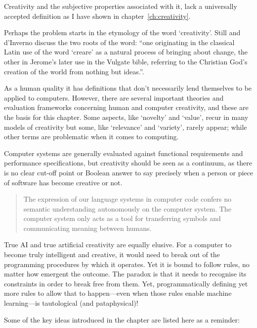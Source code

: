 Creativity and the subjective properties associated with it, lack a universally accepted definition as I have shown in chapter~\ref{ch:creativity}. 

Perhaps the problem starts in the etymology of the word `creativity'. Still and d'Inverno discuss the two roots of the word: ``one originating in the classical Latin use of the word `creare' as a natural process of bringing about change, the other in Jerome's later use in the Vulgate bible, referring to the Christian God's creation of the world from nothing but ideas.''\autocite*{Still2016}.

As a human quality it has definitions that don't necessarily lend themselves to be applied to computers. However, there are several important theories and evaluation frameworks concerning human and computer creativity, and these are the basis for this chapter. Some aspects, like `novelty' and `value', recur in many models of creativity but some, like `relevance' and `variety', rarely appear; while other terms are problematic when it comes to computing. 

Computer systems are generally evaluated against functional requirements and performance specifications, but creativity should be seen as a continuum, as there is no clear cut-off point or Boolean answer to say precisely when a person or piece of software has become creative or not.

\begin{quotation}
  The expression of our language systems in computer code confers no semantic understanding autonomously on the computer system. The computer system only acts as a tool for transferring symbols and communicating meaning between humans. 
\end{quotation}

True \ac{AI} and true artificial creativity are equally elusive. For a computer to become truly intelligent and creative, it would need to break out of the programming procedures by which it operates. Yet it is bound to follow rules, no matter how emergent the outcome. The paradox is that it needs to recognise its constraints in order to break free from them. Yet, programmatically defining yet more rules to allow that to happen---even when those rules enable machine learning---is tautological (and pataphysical)!

\spirals

Some of the key ideas introduced in the  chapter are listed here as a reminder:

